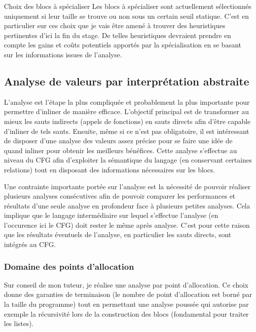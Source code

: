 \documentclass{beamer}
\begin{document}
\begin{frame}{Choix des blocs à spécialiser}
    Les blocs à spécialiser sont actuellement sélectionnés uniquement si leur taille se trouve ou non sous un certain seuil statique. C'est en particulier sur ces choix que je vais être amené à trouver des heuristiques pertinentes d'ici la fin du stage. De telles heuristiques devraient prendre en compte les gains et coûts potentiels apportés par la spécialisation en se basant sur les informations issues de l'analyse.
\end{frame}
\fi

\subsection{Analyse de valeurs par interprétation abstraite}

L'analyse est l'étape la plus compliquée et probablement la plus importante pour permettre d'inliner de manière efficace. L'objectif principal est de transformer au mieux les sauts indirects (appels de fonctions) en sauts directs afin d'être capable d'inliner de tels sauts. Ensuite, même si ce n'est pas obligatoire, il est intéressant de disposer d'une analyse des valeurs assez précise pour se faire une idée de quand inliner pour obtenir les meilleurs bénéfices. Cette analyse s'effectue au niveau du CFG afin d'exploiter la sémantique du langage (en conservant certaines relations) tout en disposant des informations nécessaires sur les blocs.

Une contrainte importante portée sur l'analyse est la nécessité de pouvoir réaliser plusieurs analyses consécutives afin de pouvoir comparer les performances et résultats d'une seule analyse en profondeur face à plusieurs petites analyses. Cela implique que le langage intermédiaire sur lequel s'effectue l'analyse (en l'occurence ici le CFG) doit rester le même après analyse. C'est pour cette raison que les résultats éventuels de l'analyse, en particulier les sauts directs, sont intégrés au CFG.

\subsubsection{Domaine des points d'allocation}

Sur conseil de mon tuteur, je réalise une analyse par point d'allocation. Ce choix donne des garanties de terminaison (le nombre de point d'allocation est borné par la taille du programme) tout en permettant une analyse poussée qui autorise par exemple la récursivité lors de la construction des blocs (fondamental pour traiter les listes).
\end{document}
